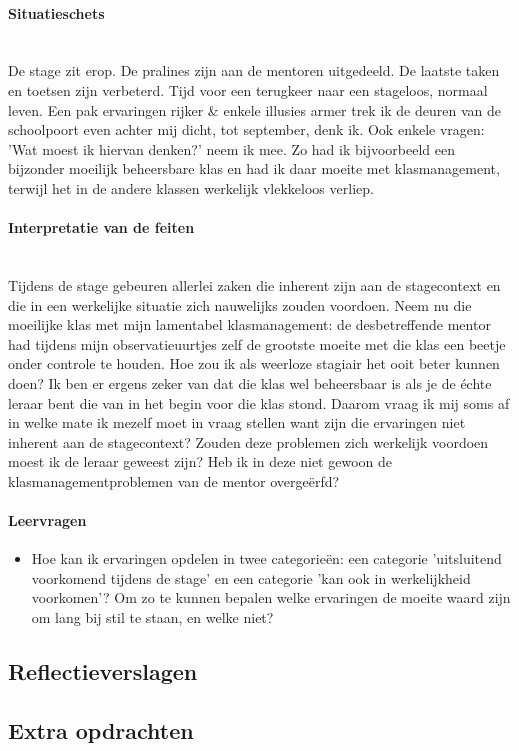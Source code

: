 \documentclass[a4paper,11pt]{article}
\newcommand{\tussen}[1]{\paragraph*{#1}\mbox{}\\}
\theoremstyle{definition}
\begin{document}
\tussen{Situatieschets}
De stage zit erop. De pralines zijn aan de mentoren uitgedeeld. De laatste taken en toetsen zijn verbeterd. Tijd voor een terugkeer naar een stageloos, normaal leven. Een pak ervaringen rijker & enkele illusies armer trek ik de deuren van de schoolpoort even achter mij dicht, tot september, denk ik. Ook enkele vragen: 'Wat moest ik hiervan denken?' neem ik mee. Zo had ik bijvoorbeeld een bijzonder moeilijk beheersbare klas en had ik daar moeite met klasmanagement, terwijl het in de andere klassen werkelijk vlekkeloos verliep.

\tussen{Interpretatie van de feiten}
Tijdens de stage gebeuren allerlei zaken die inherent zijn aan de stagecontext en die in een werkelijke situatie zich nauwelijks zouden voordoen. Neem nu die moeilijke klas met mijn lamentabel klasmanagement: de desbetreffende mentor had tijdens mijn observatieuurtjes zelf de grootste moeite met die klas een beetje onder controle te houden. Hoe zou ik als weerloze stagiair het ooit beter kunnen doen? Ik ben er ergens zeker van dat die klas wel beheersbaar is als je de échte leraar bent die van in het begin voor die klas stond. Daarom vraag ik mij soms af in welke mate ik mezelf moet in vraag stellen want zijn die ervaringen niet inherent aan de stagecontext? Zouden deze problemen zich werkelijk voordoen moest ik de leraar geweest zijn? Heb ik in deze niet gewoon de klasmanagementproblemen van de mentor overgeërfd?  
\paragraph*{Leervragen}
\begin{itemize}
  \item Hoe kan ik ervaringen opdelen in twee categorieën: een categorie 'uitsluitend voorkomend tijdens de stage' en een categorie 'kan ook in werkelijkheid voorkomen'? Om zo te kunnen bepalen welke ervaringen de moeite waard zijn om lang bij stil te staan, en welke niet?    
 \end{itemize}

 





\newpage
\subsection{Reflectieverslagen}
\subsection{Extra opdrachten}
\end{document}
